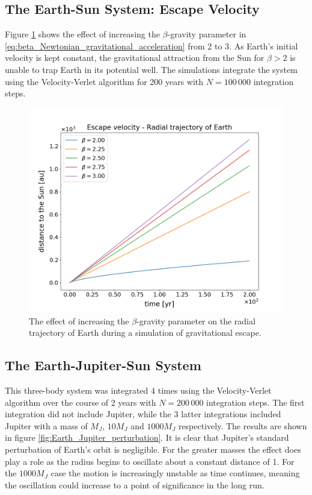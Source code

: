 \documentclass[reprint,english]{revtex4-1}
\begin{document}
\newpage
\subsection{The Earth-Sun System: Escape Velocity}
Figure \ref{fig:Earth_escape_velocity} shows the effect of increasing the \(\beta\)-gravity parameter in \eqref{eq:beta_Newtonian_gravitational_acceleration} from 2 to 3. As Earth's initial velocity is kept constant, the gravitational attraction from the Sun for \(\beta>2\) is unable to trap Earth in its potential well. The simulations integrate the system using the Velocity-Verlet algorithm for 200 years with \(N=100\,000\) integration steps.
\begin{figure}[]
\centering
\includegraphics[scale=0.3]{../output/escape_velocity/radial_trajectory.png}
\caption{The effect of increasing the \(\beta\)-gravity parameter on the radial trajectory of Earth during a simulation of gravitational escape.}\label{fig:Earth_escape_velocity}
\end{figure}

\newpage
\subsection{The Earth-Jupiter-Sun System}
This three-body system was integrated 4 times using the Velocity-Verlet algorithm over the course of 2 years with \(N=200\,000\) integration steps. The first integration did not include Jupiter, while the 3 latter integrations included Jupiter with a mass of \(M_J\), \(10M_J\) and \(1000M_J\) respectively. The results are shown in figure \ref{fig:Earth_Jupiter_perturbation}. It is clear that Jupiter's standard perturbation of Earth's orbit is negligible. For the greater masses the effect does play a role as the radius begins to oscillate about a constant distance of 1. For the \(1000M_J\) case the motion is increasingly unstable as time continues, meaning the oscillation could increase to a point of significance in the long run.
\end{document}

